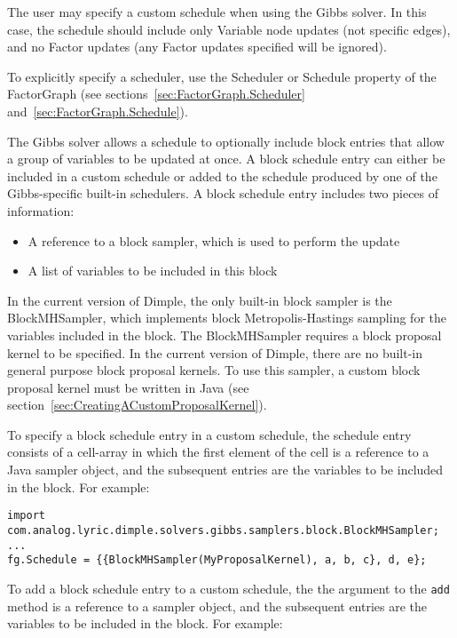 The user may specify a custom schedule when using the Gibbs solver.  In this case, the schedule should include only Variable node updates (not specific edges), and no Factor updates (any Factor updates specified will be ignored).

To explicitly specify a scheduler, use the Scheduler or Schedule property of the FactorGraph (see sections~\ref{sec:FactorGraph.Scheduler} and~\ref{sec:FactorGraph.Schedule}).

\label{sec:BlockScheduleEntries}

The Gibbs solver allows a schedule to optionally include block entries that allow a group of variables to be updated at once.  A block schedule entry can either be included in a custom schedule or added to the schedule produced by one of the Gibbs-specific built-in schedulers.  A block schedule entry includes two pieces of information:
%
\begin{itemize}
\item A reference to a block sampler, which is used to perform the update
\item A list of variables to be included in this block
\end{itemize}

In the current version of Dimple, the only built-in block sampler is the BlockMHSampler, which implements block Metropolis-Hastings sampling for the variables included in the block.  The BlockMHSampler requires a block proposal kernel to be specified.  In the current version of Dimple, there are no built-in general purpose block proposal kernels.  To use this sampler, a custom block proposal kernel must be written \ifmatlab in Java \fi (see section~\ref{sec:CreatingACustomProposalKernel}).

\ifmatlab
To specify a block schedule entry in a custom schedule, the schedule entry consists of a cell-array in which the first element of the cell is a reference to a Java sampler object, and the subsequent entries are the variables to be included in the block.  For example:

\begin{lstlisting}
import com.analog.lyric.dimple.solvers.gibbs.samplers.block.BlockMHSampler;
...
fg.Schedule = {{BlockMHSampler(MyProposalKernel), a, b, c}, d, e};
\end{lstlisting}
\fi

\ifjava
To add a block schedule entry to a custom schedule, the the argument to the \texttt{add} method is a reference to a sampler object, and the subsequent entries are the variables to be included in the block.  For example:

